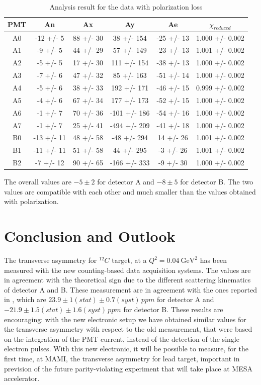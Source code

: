 \begin{table}[h]
\centering
\begin{tabular}{c|c|c|c|c|c}
\hline
 PMT   & An         & Ax        & Ay           & Ae         & $\chi _{reduced}$   \\
\hline
 A0    & -12 +/- 5  & 88 +/- 30 & 38 +/- 154   & -25 +/- 13 & 1.000 +/- 0.002   \\
 A1    & -9 +/- 5   & 44 +/- 29 & 57 +/- 149   & -23 +/- 13 & 1.001 +/- 0.002   \\
 A2    & -5 +/- 5   & 17 +/- 30 & 111 +/- 154  & -38 +/- 13 & 1.000 +/- 0.002   \\
 A3    & -7 +/- 6   & 47 +/- 32 & 85 +/- 163   & -51 +/- 14 & 1.000 +/- 0.002   \\
 A4    & -5 +/- 6   & 38 +/- 33 & 192 +/- 171  & -46 +/- 15 & 0.999 +/- 0.002   \\
 A5    & -4 +/- 6   & 67 +/- 34 & 177 +/- 173  & -52 +/- 15 & 1.000 +/- 0.002   \\
 A6    & -1 +/- 7   & 70 +/- 36 & -101 +/- 186 & -54 +/- 16 & 1.000 +/- 0.002   \\
 A7    & -1 +/- 7   & 25 +/- 41 & -494 +/- 209 & -41 +/- 18 & 1.000 +/- 0.002   \\
 B0    & -13 +/- 11 & 48 +/- 58 & -48 +/- 294  & 14 +/- 26  & 1.001 +/- 0.002   \\
 B1    & -11 +/- 11 & 51 +/- 58 & 44 +/- 295   & -3 +/- 26  & 1.001 +/- 0.002   \\
 B2    & -7 +/- 12  & 90 +/- 65 & -166 +/- 333 & -9 +/- 30  & 1.000 +/- 0.002   \\
\hline
\end{tabular}
\caption{Analysis result for the data with polarization loss}
\label{tab:PolTab}
\end{table}

The overall values are $-5 \pm 2$ for detector A and $-8 \pm 5$ for detector B. The two values are compatible with each other and much smaller than the values obtained with polarization.

\section{Conclusion and Outlook} 

The transverse asymmetry for $^{12}C$ target, at a $Q^{2} = \SI{0.04}{\giga \electronvolt \squared}$ has been measured with the new counting-based data acquisition systems. The values are in agreement with the theoretical sign due to the different scattering kinematics of detector A and B. These measurement are in agreement with the ones reported in \cite{Esser:2018vdp}, which are $23.9  \pm 1 (stat) \pm 0.7 (syst)  \, ppm$ for detector A and $ -21.9 \pm 1.5 (stat) \pm 1.6 (syst) \, ppm$ for detector B.
These results are encouraging: with the new electronic setup we have obtained similar values for the transverse asymmetry with respect to the old measurement, that were based on the integration of the PMT current, instead of the detection of the single electron pulses. With this new electronic, it will be possible to measure, for the first time, at MAMI, the transverse asymmetry for lead target, important in prevision of the future parity-violating experiment that will take place at MESA accelerator.